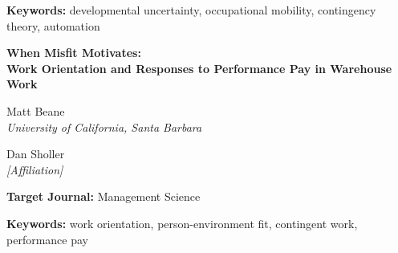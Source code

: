 \documentclass[12pt]{article}
\begin{document}
\noindent\textbf{Keywords:} developmental uncertainty, occupational mobility, contingency theory, automation

\newpage

\begin{center}
{\Large\bfseries When Misfit Motivates:\\[0.3em]
Work Orientation and Responses to Performance Pay in Warehouse Work}

\vspace{1em}

Matt Beane\\
\textit{University of California, Santa Barbara}

\vspace{0.5em}

Dan Sholler\\
\textit{[Affiliation]}
\end{center}

\vspace{1em}

\begin{abstract}
Person-environment fit theory predicts that workers experiencing misfit will withdraw effort or exit. We document conditions under which misfit instead intensifies effort. Using 55,825 worker-month observations from a warehouse incentive program and 77 interviews, we find that seasonal workers---who experience status misfit---respond nearly twice as strongly to performance pay as full-time workers ($\beta=0.21$ vs. $\beta=0.12$). Workers who later earn promotions performed 18 percentage points better in their first month---before receiving meaningful feedback---suggesting some workers arrive primed to demonstrate value. Qualitative evidence illuminates heterogeneity within this pattern: workers differ in whether they seek advancement or optimize for present conditions (flexibility, target income). Work orientation provides an interpretive lens for this variation---career-oriented workers appear to use incentives as signaling channels toward promotion, while job-oriented workers show little response regardless of incentive magnitude. Strikingly, the firm's incentive allocation inverts this responsiveness: the most responsive workers (seasonal) receive the least pay, while full-time workers receive four times more despite lower response. This misallocation suggests that management is unaware of the orientation-driven response patterns we document. These findings extend person-environment fit theory by identifying conditions under which misfit motivates rather than demotivates: when advancement pathways exist and workers seek to change their status, misfit can intensify effort rather than trigger withdrawal.
\end{abstract}

\noindent\textbf{Target Journal:} Management Science

\noindent\textbf{Keywords:} work orientation, person-environment fit, contingent work, performance pay
\end{document}
